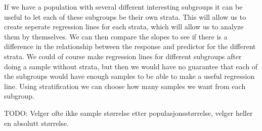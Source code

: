 \documentclass{article}
\begin{document}
If we have a population with several different interesting subgroups it can be
useful to let each of these subgroups be their own strata. This will allow us to
create seperate regression lines for each strata, which will allow us to
analyze them by themselves. We can then compare the slopes to see if there is a difference in the relationship between the
response and predictor for the different strata. We could of course make
regression lines for different subgroups after doing a sample without strata,
but then we would have no guarantee that each of the subgroups would have enough
samples to be able to make a useful regression line. Using stratification we can
choose how many samples we want from each subgroup.


TODO: Velger ofte ikke sample størrelse etter populasjonsstørrelse, velger
heller en absolutt størrelse.
\end{document}
